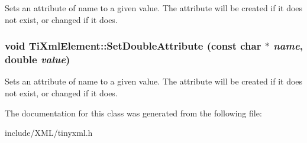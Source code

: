 \label{class_ti_xml_element_abf0b3bd7f0e4c746a89ec6e7f101fc32}
Sets an attribute of name to a given value. The attribute will be created if it does not exist, or changed if it does. \hypertarget{class_ti_xml_element_a0d1dd975d75496778177e35abfe0ec0b}{
\subsubsection[{SetDoubleAttribute}]{\setlength{\rightskip}{0pt plus 5cm}void TiXmlElement::SetDoubleAttribute (const char $\ast$ {\em name}, \/  double {\em value})}}
\label{class_ti_xml_element_a0d1dd975d75496778177e35abfe0ec0b}
Sets an attribute of name to a given value. The attribute will be created if it does not exist, or changed if it does. 

The documentation for this class was generated from the following file:\begin{DoxyCompactItemize}
\item 
include/XML/tinyxml.h\end{DoxyCompactItemize}
